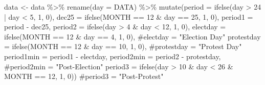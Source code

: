 \documentclass[
  letterpaper,
  DIV=11,
  numbers=noendperiod]{scrartcl}
\newenvironment{Shaded}{\begin{snugshade}}{\end{snugshade}}
\newcommand{\AttributeTok}[1]{\textcolor[rgb]{0.40,0.45,0.13}{#1}}
\newcommand{\CommentTok}[1]{\textcolor[rgb]{0.37,0.37,0.37}{#1}}
\newcommand{\DecValTok}[1]{\textcolor[rgb]{0.68,0.00,0.00}{#1}}
\newcommand{\FunctionTok}[1]{\textcolor[rgb]{0.28,0.35,0.67}{#1}}
\newcommand{\NormalTok}[1]{\textcolor[rgb]{0.00,0.23,0.31}{#1}}
\newcommand{\OtherTok}[1]{\textcolor[rgb]{0.00,0.23,0.31}{#1}}
\newcommand{\SpecialCharTok}[1]{\textcolor[rgb]{0.37,0.37,0.37}{#1}}
\begin{document}
\begin{Shaded}
\begin{Highlighting}[]
\NormalTok{data }\OtherTok{\textless{}{-}}\NormalTok{ data }\SpecialCharTok{\%\textgreater{}\%} 
  \FunctionTok{rename}\NormalTok{(}\AttributeTok{day =}\NormalTok{ DATA) }\SpecialCharTok{\%\textgreater{}\%} 
  \FunctionTok{mutate}\NormalTok{(}\AttributeTok{period =} \FunctionTok{ifelse}\NormalTok{(day }\SpecialCharTok{\textgreater{}} \DecValTok{24} \SpecialCharTok{|}\NormalTok{ day }\SpecialCharTok{\textless{}} \DecValTok{5}\NormalTok{, }\DecValTok{1}\NormalTok{, }\DecValTok{0}\NormalTok{),}
         \AttributeTok{dec25 =} \FunctionTok{ifelse}\NormalTok{(MONTH }\SpecialCharTok{==} \DecValTok{12} \SpecialCharTok{\&}\NormalTok{ day }\SpecialCharTok{==} \DecValTok{25}\NormalTok{, }\DecValTok{1}\NormalTok{, }\DecValTok{0}\NormalTok{),}
         \AttributeTok{period1 =}\NormalTok{ period }\SpecialCharTok{{-}}\NormalTok{ dec25,}
         \AttributeTok{period2 =} \FunctionTok{ifelse}\NormalTok{(day }\SpecialCharTok{\textgreater{}} \DecValTok{4} \SpecialCharTok{\&}\NormalTok{ day }\SpecialCharTok{\textless{}} \DecValTok{12}\NormalTok{, }\DecValTok{1}\NormalTok{, }\DecValTok{0}\NormalTok{),}
         \AttributeTok{electday =} \FunctionTok{ifelse}\NormalTok{(MONTH }\SpecialCharTok{==} \DecValTok{12} \SpecialCharTok{\&}\NormalTok{ day }\SpecialCharTok{==} \DecValTok{4}\NormalTok{, }\DecValTok{1}\NormalTok{, }\DecValTok{0}\NormalTok{),}
         \CommentTok{\#electday = "Election Day"}
         \AttributeTok{protestday =} \FunctionTok{ifelse}\NormalTok{(MONTH }\SpecialCharTok{==} \DecValTok{12} \SpecialCharTok{\&}\NormalTok{ day }\SpecialCharTok{==} \DecValTok{10}\NormalTok{, }\DecValTok{1}\NormalTok{, }\DecValTok{0}\NormalTok{),}
         \CommentTok{\#protestday = "Protest Day"}
         \AttributeTok{period1min =}\NormalTok{ period1 }\SpecialCharTok{{-}}\NormalTok{ electday,}
         \AttributeTok{period2min =}\NormalTok{ period2 }\SpecialCharTok{{-}}\NormalTok{ protestday,}
         \CommentTok{\#period2min = "Post{-}Election"}
         \AttributeTok{period3 =} \FunctionTok{ifelse}\NormalTok{(day }\SpecialCharTok{\textgreater{}} \DecValTok{10} \SpecialCharTok{\&}\NormalTok{ day }\SpecialCharTok{\textless{}} \DecValTok{26} \SpecialCharTok{\&}\NormalTok{ MONTH }\SpecialCharTok{==} \DecValTok{12}\NormalTok{, }\DecValTok{1}\NormalTok{, }\DecValTok{0}\NormalTok{))}
         \CommentTok{\#period3 = "Post{-}Protest"}
\end{Highlighting}
\end{Shaded}
\end{document}
